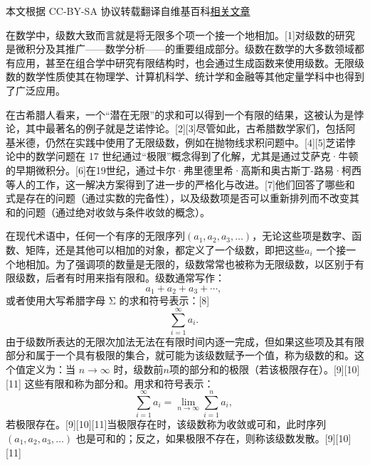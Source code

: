 
本文根据 CC-BY-SA 协议转载翻译自维基百科\href{https://en.wikipedia.org/wiki/Series_(mathematics)}{相关文章}

在数学中，级数大致而言就是将无限多个项一个接一个地相加。[1]对级数的研究是微积分及其推广——数学分析——的重要组成部分。级数在数学的大多数领域都有应用，甚至在组合学中研究有限结构时，也会通过生成函数来使用级数。无限级数的数学性质使其在物理学、计算机科学、统计学和金融等其他定量学科中也得到了广泛应用。

在古希腊人看来，一个“潜在无限”的求和可以得到一个有限的结果，这被认为是悖论，其中最著名的例子就是芝诺悖论。[2][3]尽管如此，古希腊数学家们，包括阿基米德，仍然在实践中使用了无限级数，例如在抛物线求积问题中。[4][5]芝诺悖论中的数学问题在 17 世纪通过“极限”概念得到了化解，尤其是通过艾萨克·牛顿的早期微积分。[6]在19世纪，通过卡尔·弗里德里希·高斯和奥古斯丁-路易·柯西等人的工作，这一解决方案得到了进一步的严格化与改进。[7]他们回答了哪些和式是存在的问题（通过实数的完备性），以及级数项是否可以重新排列而不改变其和的问题（通过绝对收敛与条件收敛的概念）。

在现代术语中，任何一个有序的无限序列$(a_{1}, a_{2}, a_{3}, \ldots)$，无论这些项是数字、函数、矩阵，还是其他可以相加的对象，都定义了一个级数，即把这些$a_i$ 一个接一个地相加。为了强调项的数量是无限的，级数常常也被称为无限级数，以区别于有限级数，后者有时用来指有限和。级数通常写作：
$$
a_{1} + a_{2} + a_{3} + \cdots ,~
$$
或者使用大写希腊字母 Σ 的求和符号表示：[8]
$$
\sum_{i=1}^{\infty} a_i .~
$$
由于级数所表达的无限次加法无法在有限时间内逐一完成，但如果这些项及其有限部分和属于一个具有极限的集合，就可能为该级数赋予一个值，称为级数的和。这个值定义为：当 $n \to \infty$ 时，级数前$n$项的部分和的极限（若该极限存在）。[9][10][11] 这些有限和称为部分和。用求和符号表示：
$$
\sum_{i=1}^{\infty} a_i = \lim_{n \to \infty} \sum_{i=1}^{n} a_i ,~
$$
若极限存在。[9][10][11]当极限存在时，该级数称为收敛或可和，此时序列$(a_{1}, a_{2}, a_{3}, \ldots)$ 也是可和的；反之，如果极限不存在，则称该级数发散。[9][10][11]
